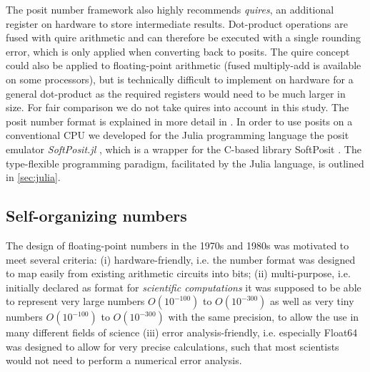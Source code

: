 The posit number framework also highly recommends \emph{quires}, an additional register on hardware to store intermediate results.
Dot-product operations are fused with quire arithmetic and can therefore be executed with a single rounding error, which is only applied
when converting back to posits. The quire concept could also be applied to floating-point arithmetic (fused multiply-add is available on
some processors), but is technically difficult to implement on hardware for a general dot-product as the required registers would need
to be much larger in size. For fair comparison we do not take quires into account in this study. The posit number format is explained in
more detail in \cite{Gustafson2017a}. In order to use posits on a conventional CPU we developed for the Julia programming language
\citep{Bezanson2017} the posit emulator \emph{SoftPosit.jl} \citep{Klower2019a}, which is a wrapper for the C-based library SoftPosit
\citep{Leong2020}. The type-flexible programming paradigm, facilitated by the Julia language, is outlined in \ref{sec:julia}.

\subsection{Self-organizing numbers}
\label{sec:sonums}

The design of floating-point numbers in the 1970s and 1980s was motivated to meet several criteria: (i) hardware-friendly, i.e. the number format was designed to map easily from existing arithmetic circuits into bits; (ii) multi-purpose, i.e. initially declared as format for \emph{scientific computations} it was supposed to be able to represent very large numbers $O(10^{-100})$ to $O(10^{-300})$ as well as very tiny numbers $O(10^{-100})$ to $O(10^{-300})$ with the same precision, to allow the use in many different fields of science (iii) error analysis-friendly, i.e. especially Float64 was designed to allow for very precise calculations, such that most scientists would not need to perform a numerical error analysis.

